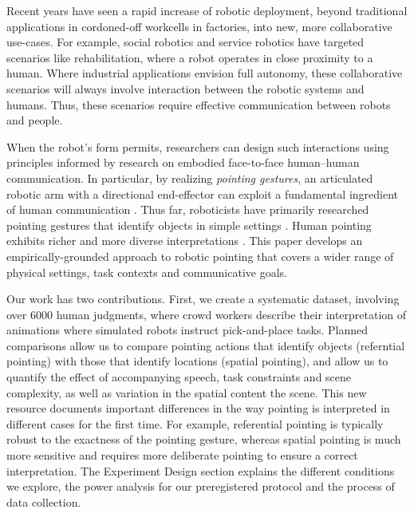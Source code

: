 Recent years have seen a rapid increase of robotic deployment, beyond traditional applications in cordoned-off workcells in factories, into new, more collaborative use-cases. For example, social robotics and service robotics have targeted scenarios like rehabilitation, where a robot operates in close proximity to a human. Where industrial applications envision full autonomy, these collaborative scenarios will always involve interaction between the robotic systems and humans. Thus, these scenarios require effective communication between robots and people.

When the robot's form permits, researchers can design such interactions using principles informed by research on embodied face-to-face human--human communication.  In particular, by realizing \emph{pointing gestures}, an articulated robotic arm with a directional end-effector can exploit a fundamental ingredient of human communication \cite{kita2003pointing}.  Thus far, roboticists have primarily researched pointing gestures that identify objects in simple settings \cite[a.o.]{han2018placing,holladay2014legible,zhao2016experimental}.  Human pointing exhibits richer and more diverse interpretations \cite{kendon:2004}.  This paper develops an empirically-grounded approach to robotic pointing that covers a wider range of physical settings, task contexts and communicative goals.

Our work has two contributions.  First, we create a systematic dataset, involving over 6000 human judgments, where crowd workers describe their interpretation of animations where simulated robots instruct pick-and-place tasks.  Planned comparisons allow us to compare pointing actions that identify objects (referntial pointing) with those that identify locations (spatial pointing), and allow us to quantify the effect of accompanying speech, task constraints and scene complexity, as well as variation in the spatial content the scene.  This new resource documents important differences in the way pointing is interpreted in different cases for the first time.  For example, referential pointing is typically robust to the exactness of the pointing gesture, whereas spatial pointing is much more sensitive and requires more deliberate pointing to ensure a correct interpretation.  The Experiment Design section explains the different conditions we explore, the power analysis for our preregistered protocol and the process of data collection. 

